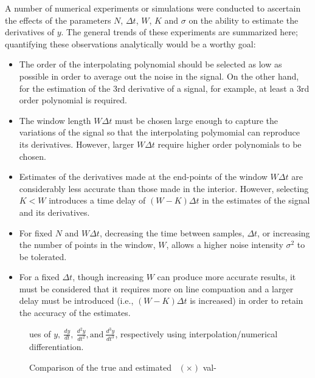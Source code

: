 A number of numerical experiments or simulations
were conducted to ascertain the effects of the
parameters $N$,  $\Delta t$, $W$, $K$ and $\sigma$ on the ability to 
estimate the derivatives
of $y$. 
The general trends of these experiments are summarized here; quantifying
these observations analytically would be a worthy goal:
\begin{itemize}

\item The order of the interpolating polynomial should be selected as low as 
possible in order to average out the noise in the signal. 
On the other hand, for the estimation of 
the 3rd derivative of a signal, for example, 
at least a 3rd order polynomial is required.

\item The window length $W \Delta t$ must be chosen large enough to
capture the variations of the signal so that the interpolating polymomial 
can reproduce its derivatives.  However, larger $W \Delta t$ require
higher order polynomials to be chosen.

\item Estimates of the derivatives made at the end-points of the window
$W \Delta t$ are considerably less accurate than those made in the interior.
However, selecting $K < W$ introduces a time delay of $(W-K) \Delta t$
in the estimates of the signal and its derivatives. 

\item For fixed $N$ and $W \Delta t$, decreasing the time between samples,
$\Delta t$, or increasing
the number of points in the window, $W$, allows a higher noise intensity
$\sigma^2$ to be tolerated.

\item For a fixed $\Delta t$, though increasing $W$ can produce more accurate results,
it must be considered that it requires more on line compuation and a larger
delay must be introduced (i.e., $(W-K)\Delta t$ is increased)
in order to retain the accuracy of the estimates. 

\end{itemize}

\begin{figure}[hbt]
\centerline{}
\smallskip
\small
\caption{\small Comparison of the true and estimated \ $(\times)$ val-} 
ues of $y, \ \frac{dy}{dt}, \ 
\frac{d^2y}{dt^2}, 
 \mbox{and} \
\frac{d^3y}{dt^3}$,  respectively using interpolation/numerical differentiation.
\label{figmplot10}
\end{figure}

